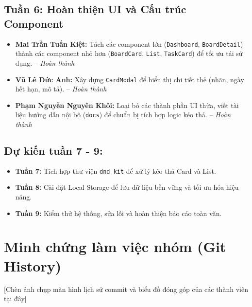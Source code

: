 \section*{Tuần 6: Hoàn thiện UI và Cấu trúc Component}
\begin{itemize}
    \item \textbf{Mai Trần Tuấn Kiệt:} Tách các component lớn (\texttt{Dashboard}, \texttt{BoardDetail}) thành các component nhỏ hơn (\texttt{BoardCard}, \texttt{List}, \texttt{TaskCard}) để tối ưu tái sử dụng. -- \textit{Hoàn thành}
    \item \textbf{Vũ Lê Đức Anh:} Xây dựng \texttt{CardModal} để hiển thị chi tiết thẻ (nhãn, ngày hết hạn, mô tả). -- \textit{Hoàn thành}
    \item \textbf{Phạm Nguyễn Nguyên Khôi:} Loại bỏ các thành phần UI thừa, viết tài liệu hướng dẫn nội bộ (\texttt{docs}) để chuẩn bị tích hợp logic kéo thả. -- \textit{Hoàn thành}
\end{itemize}

\section*{Dự kiến tuần 7 - 9:}
\begin{itemize}
    \item \textbf{Tuần 7:} Tích hợp thư viện \texttt{dnd-kit} để xử lý kéo thả Card và List.
    \item \textbf{Tuần 8:} Cài đặt Local Storage để lưu dữ liệu bền vững và tối ưu hóa hiệu năng.
    \item \textbf{Tuần 9:} Kiểm thử hệ thống, sửa lỗi và hoàn thiện báo cáo toàn văn.
\end{itemize}

\chapter{Minh chứng làm việc nhóm (Git History)}
[Chèn ảnh chụp màn hình lịch sử commit và biểu đồ đóng góp của các thành viên tại đây]
